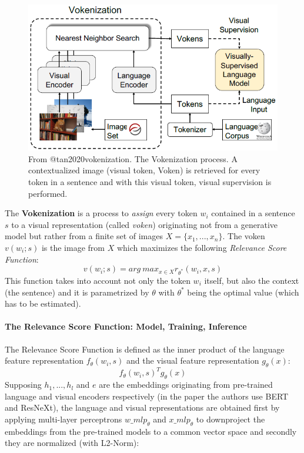 \documentclass[
]{krantz}
\begin{document}
\begin{figure}

{\centering \includegraphics[width=0.8\linewidth]{figures/02-03-img-support-text/img-tan2020-05} 

}

\caption{From @tan2020vokenization. The Vokenization process. A contextualized image (visual token, Voken) is retrieved for every token in a sentence and with this visual token, visual supervision is performed.}\label{fig:img-tan2020-05}
\end{figure}

The \textbf{Vokenization} is a process to \emph{assign} every token \(w_i\) contained in a sentence \(s\) to a visual representation (called \emph{voken}) originating not from a generative model but rather from a finite set of images \(X=\{x_1,...,x_n\}\). The voken \(v(w_i;s)\) is the image from \(X\) which maximizes the following \emph{Relevance Score Function}:
\[v(w_i;s)=arg\ max_{x\in X}r_{\theta^{*}}(w_i,x,s)\]
This function takes into account not only the token \(w_i\) itself, but also the context (the sentence) and it is parametrized by \(\theta\) with \(\theta^{*}\) being the optimal value (which has to be estimated).

\hypertarget{the-relevance-score-function-model-training-inference}{%
\paragraph{The Relevance Score Function: Model, Training, Inference}\label{the-relevance-score-function-model-training-inference}}

The Relevance Score Function is defined as the inner product of the language feature representation \(f_{\theta}(w_i,s)\) and the visual feature representation \(g_{\theta}(x)\):
\[f_{\theta}(w_i,s)^Tg_{\theta}(x)\]
Supposing \(h_1,...,h_l\) and \(e\) are the embeddings originating from pre-trained language and visual encoders respectively (in the paper the authors use BERT and ResNeXt), the language and visual representations are obtained first by applying multi-layer perceptrons \(w\_mlp_{\theta}\) and \(x\_mlp_{\theta}\) to downproject the embeddings from the pre-trained models to a common vector space and secondly they are normalized (with L2-Norm):
\end{document}
